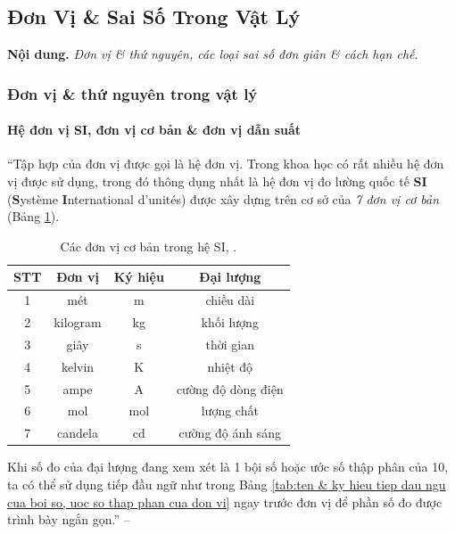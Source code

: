\documentclass{article}
\numberwithin{equation}{section}
\begin{document}

\subsection{Đơn Vị \& Sai Số Trong Vật Lý}
\textbf{Nội dung.} \textit{Đơn vị \& thứ nguyên, các loại sai số đơn giản \& cách hạn chế}.

\subsubsection{Đơn vị \& thứ nguyên trong vật lý}

\paragraph{Hệ đơn vị SI, đơn vị cơ bản \& đơn vị dẫn suất}
``Tập hợp của đơn vị được gọi là hệ đơn vị. Trong khoa học có rất nhiều hệ đơn vị được sử dụng, trong đó thông dụng nhất là hệ đơn vị đo lường quốc tế \textbf{SI} (\textbf{S}yst\`eme \textbf{I}nternational d'unit\'es) được xây dựng trên cơ sở của \textit{7 đơn vị cơ bản} (Bảng \ref{tab:cac don vi co ban trong he SI}).
\begin{table}[H]
	\centering
	\begin{tabular}{|c|c|c|c|}
		\hline
		\textbf{STT} & \textbf{Đơn vị} & \textbf{Ký hiệu} & \textbf{Đại lượng} \\
		\hline
		1 & mét & m & chiều dài \\
		\hline
		2 & kilogram & kg & khối lượng \\
		\hline
		3 & giây & s & thời gian \\
		\hline
		4 & kelvin & K & nhiệt độ \\
		\hline
		5 & ampe & A & cường độ dòng điện \\
		\hline
		6 & mol & mol & lượng chất \\
		\hline
		7 & candela & cd & cường độ ánh sáng \\
		\hline
	\end{tabular}
	\caption{Các đơn vị cơ bản trong hệ SI, \cite[Bảng 3.1, p. 16]{SGK_Vat_Ly_10_Chan_Troi_Sang_Tao}.}
	\label{tab:cac don vi co ban trong he SI}
\end{table}
Khi số đo của đại lượng đang xem xét là 1 bội số hoặc ước số thập phân của 10, ta có thể sử dụng tiếp đầu ngữ như trong Bảng \ref{tab:ten & ky hieu tiep dau ngu cua boi so, uoc so thap phan cua don vi} ngay trước đơn vị để phần số đo được trình bày ngắn gọn.'' -- \cite[p. 15]{SGK_Vat_Ly_10_Chan_Troi_Sang_Tao}
\end{document}
